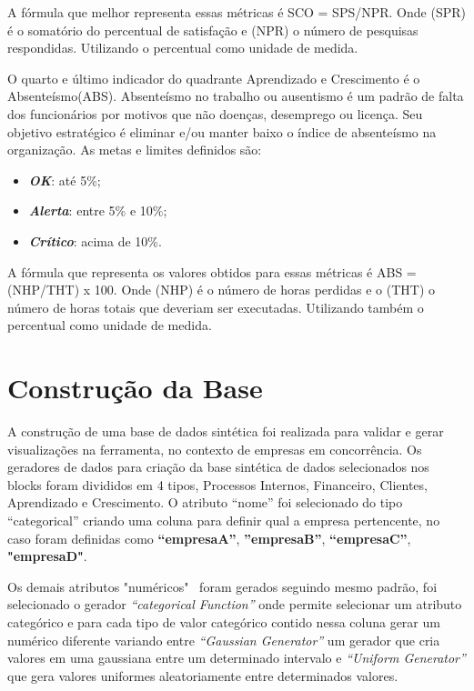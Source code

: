\documentclass[
	12pt,				%
	openright,			%
	oneside,			%
	a4paper,			%
	english,			%
	brazil				%
	]{abntex2}
\begin{document}
A fórmula que melhor representa essas métricas é SCO = SPS/NPR. Onde (SPR) é o somatório do percentual de satisfação e (NPR) o número de pesquisas respondidas. Utilizando o percentual como unidade de medida.

O quarto e último indicador do quadrante Aprendizado e Crescimento é o Absenteísmo(ABS). Absenteísmo no trabalho ou ausentismo é um padrão de falta dos funcionários por motivos que não doenças, desemprego ou licença. Seu objetivo estratégico é eliminar e/ou manter baixo o índice de absenteísmo na organização. As metas e limites definidos são:
\begin{itemize}
\item  \textbf{\textit{OK}}: até 5\%;
\item  \textbf{\textit{Alerta}}: entre 5\% e 10\%;
\item  \textbf{\textit{Crítico}}: acima de 10\%.
\end{itemize}

A fórmula que representa os valores obtidos para essas métricas é ABS = (NHP/THT) x 100. Onde (NHP) é o número de horas perdidas e o (THT) o número de horas totais que deveriam ser executadas. Utilizando também o percentual como unidade de medida.



\section{Construção da Base}
A construção de uma base de dados sintética foi realizada para validar e gerar visualizações na ferramenta, no contexto de empresas em concorrência. 
Os geradores de dados para criação da base sintética de dados selecionados nos blocks foram divididos em 4 tipos, Processos Internos, Financeiro, Clientes, Aprendizado e Crescimento.
O atributo “nome” foi selecionado do tipo “categorical” criando uma coluna para definir qual a empresa pertencente, no caso foram definidas como \textbf{“empresaA”}, \textbf{”empresaB”},  \textbf{“empresaC”}, \textbf{"empresaD"}.

Os demais atributos "numéricos" \ foram gerados seguindo mesmo padrão, foi selecionado o gerador \textit{“categorical Function”} onde permite selecionar um atributo categórico e para cada tipo de valor categórico contido nessa coluna gerar um numérico diferente variando entre \textit{“Gaussian Generator”} um gerador que cria valores em uma gaussiana entre um determinado intervalo e \textit{“Uniform Generator”} que gera valores uniformes aleatoriamente entre determinados valores. 
\end{document}
